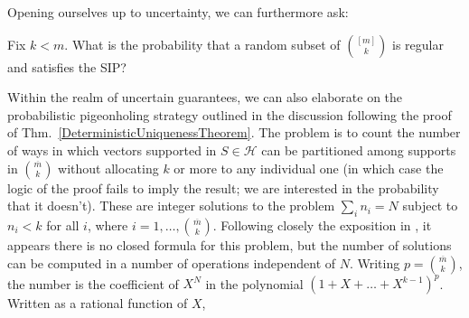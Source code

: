 
Opening ourselves up to uncertainty, we can furthermore ask:
\begin{question}\label{probofsip}
Fix $k < m$. What is the probability that a random subset of ${[m] \choose k}$ is regular and satisfies the SIP?
\end{question}

Within the realm of uncertain guarantees, we can also elaborate on the probabilistic pigeonholing strategy outlined in the discussion following the proof of Thm.~\ref{DeterministicUniquenessTheorem}. The problem is to count the number of ways in which vectors supported in $S \in \mathcal{H}$ can be partitioned among supports in ${\overline m \choose k}$ without allocating $k$ or more to any individual one (in which case the logic of the proof fails to imply the result; we are interested in the probability that it doesn't). These are integer solutions to the problem $\sum_i n_i = N$ subject to $n_i < k$ for all $i$, where $i = 1, \ldots, {\overline m \choose k}$. Following closely the exposition in \cite{stackexchangeanswer}, it appears there is no closed formula for this problem, but the number of solutions can be computed in a number of operations independent of $N$. Writing $p = {\overline m \choose k}$, the number is the coefficient of $X^N$ in the polynomial $(1 + X + \ldots + X^{k-1})^p$. Written as a rational function of $X$, 

